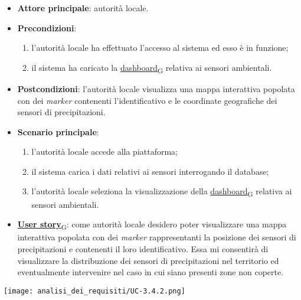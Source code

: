 \newpage
{}
\begin{itemize}
	\item \textbf{Attore principale}: autorità locale.
	\item \textbf{Precondizioni}:
	      \begin{enumerate}
		      \item l'autorità locale ha effettuato l'accesso al sistema ed esso è in funzione;
		      \item il sistema ha caricato la \href{https://7last.github.io/docs/pb/documentazione-interna/glossario\#dashboard}{dashboard\textsubscript{G}} relativa ai sensori ambientali.
	      \end{enumerate}
	\item \textbf{Postcondizioni}: l'autorità locale visualizza una mappa interattiva popolata con dei \textit{marker} contenenti l'identificativo e le coordinate geografiche dei sensori di precipitazioni.
	\item \textbf{Scenario principale}:
	      \begin{enumerate}
		      \item l'autorità locale accede alla piattaforma;
		      \item il sistema carica i dati relativi ai sensori interrogando il database;
		      \item l'autorità locale seleziona la visualizzazione della \href{https://7last.github.io/docs/pb/documentazione-interna/glossario\#dashboard}{dashboard\textsubscript{G}} relativa ai sensori ambientali.
	      \end{enumerate}
	\item \href{https://7last.github.io/docs/pb/documentazione-interna/glossario\#user-story}{\textbf{User story}\textsubscript{G}}:
	      come autorità locale desidero poter visualizzare una mappa interattiva popolata con dei \textit{marker} rappresentanti la posizione dei sensori di precipitazioni
	      e contenenti il loro identificativo. Essa mi consentirà di visualizzare la distribuzione dei sensori di precipitazioni nel territorio ed
	      eventualmente intervenire nel caso in cui siano presenti zone non coperte.
\end{itemize}
\begin{center}
	\texttt{[image: analisi\_dei\_requisiti/UC-3.4.2.png]}
\end{center}

